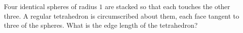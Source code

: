 Four identical spheres of radius $1$ are stacked so that each touches the other three. A regular tetrahedron is circumscribed about them, each face tangent to three of the spheres. What is the edge length of the tetrahedron?
